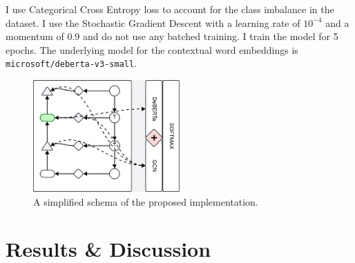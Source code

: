 \documentclass[11pt]{article}
\begin{document}
I use Categorical Cross Entropy loss to account for the class imbalance in the dataset. I use the Stochastic Gradient Descent with a learning rate of $10^{-4}$ and a momentum of $0.9$ and do not use any batched training. I train the model for 5 epochs. The underlying model for the contextual word embeddings is \verb|microsoft/deberta-v3-small|.

\begin{figure}
    \centering
    \includegraphics[width=0.5\textwidth]{figures/model_architecture.png}
    \caption{A simplified schema of the proposed implementation.}\label{fig:arch_map}
\end{figure}





\section{Results \& Discussion}
\end{document}
